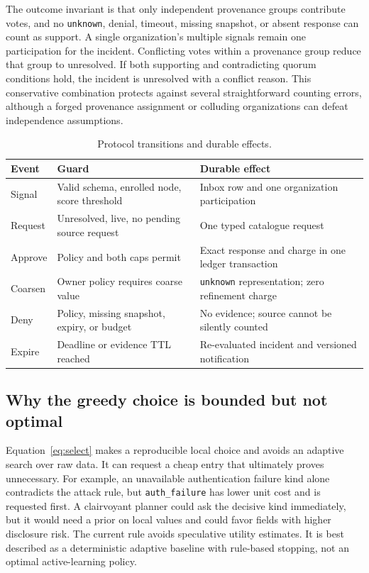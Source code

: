 \documentclass[conference,letterpaper]{IEEEtran}
\begin{document}
The outcome invariant is that only independent provenance groups contribute votes, and no \texttt{unknown}, denial, timeout, missing snapshot, or absent response can count as support. A single organization's multiple signals remain one participation for the incident. Conflicting votes within a provenance group reduce that group to unresolved. If both supporting and contradicting quorum conditions hold, the incident is unresolved with a conflict reason. This conservative combination protects against several straightforward counting errors, although a forged provenance assignment or colluding organizations can defeat independence assumptions.

\begin{table}[t]
\centering\caption{Protocol transitions and durable effects.}
\label{tab:transitions}\scriptsize\setlength{\tabcolsep}{2pt}
\begin{tabular}{p{}p{}p{}}\hline
Event & Guard & Durable effect \\\hline
Signal & Valid schema, enrolled node, score threshold & Inbox row and one organization participation\\
Request & Unresolved, live, no pending source request & One typed catalogue request\\
Approve & Policy and both caps permit & Exact response and charge in one ledger transaction\\
Coarsen & Owner policy requires coarse value & \texttt{unknown} representation; zero refinement charge\\
Deny & Policy, missing snapshot, expiry, or budget & No evidence; source cannot be silently counted\\
Expire & Deadline or evidence TTL reached & Re-evaluated incident and versioned notification\\\hline
\end{tabular}
\end{table}

\subsection{Why the greedy choice is bounded but not optimal}
Equation~\ref{eq:select} makes a reproducible local choice and avoids an adaptive search over raw data. It can request a cheap entry that ultimately proves unnecessary. For example, an unavailable authentication failure kind alone contradicts the attack rule, but \texttt{auth\_failure} has lower unit cost and is requested first. A clairvoyant planner could ask the decisive kind immediately, but it would need a prior on local values and could favor fields with higher disclosure risk. The current rule avoids speculative utility estimates. It is best described as a deterministic adaptive baseline with rule-based stopping, not an optimal active-learning policy.
\end{document}
